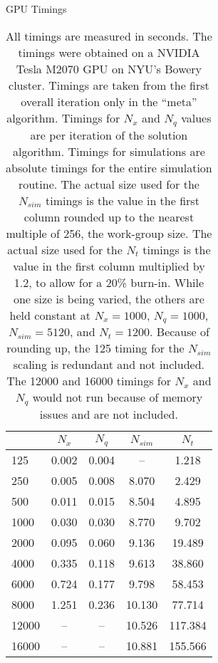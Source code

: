 \documentclass[a4paper,12pt]{article}
\numberwithin{equation}{section}
\theoremstyle{definition}
\begin{document}
\begin{table}[ht]
  \centering
  \caption{GPU Timings}
  \label{tab:timings}
  \begin{tabular}{l c c c c}
    \toprule
    & $N_x$ & $N_q$ & $N_{sim}$ & $N_t$ \\
    \midrule
    125 & 0.002 & 0.004 &  -- & 1.218 \\
    250 & 0.005 & 0.008 & 8.070 & 2.429 \\
    500 & 0.011 & 0.015 & 8.504 & 4.895 \\
    1000 & 0.030 & 0.030 & 8.770 & 9.702 \\
    2000 & 0.095 & 0.060 & 9.136 & 19.489 \\
    4000 & 0.335 & 0.118 & 9.613 & 38.860 \\
    6000 & 0.724 & 0.177 & 9.798 & 58.453 \\
    8000 & 1.251 & 0.236 & 10.130 & 77.714 \\
    12000 &  -- &  -- & 10.526 & 117.384 \\
    16000 &  -- &  -- & 10.881 & 155.566 \\
    \bottomrule
  \end{tabular}
  \caption*{\footnotesize All timings are measured in seconds. The timings were obtained on a NVIDIA Tesla M2070 GPU on NYU's Bowery cluster. Timings are taken from the first overall iteration only in the ``meta'' algorithm. Timings for $N_x$ and $N_q$ values are per iteration of the solution algorithm. Timings for simulations are absolute timings for the entire simulation routine. The actual size used for the $N_{sim}$ timings is the value in the first column rounded up to the nearest multiple of 256, the work-group size. The actual size used for the $N_t$ timings is the value in the first column multiplied by 1.2, to allow for a 20\% burn-in. While one size is being varied, the others are held constant at $N_x = 1000$, $N_q = 1000$, $N_{sim} = 5120$, and $N_t = 1200$. Because of rounding up, the 125 timing for the $N_{sim}$ scaling is redundant and not included. The 12000 and 16000 timings for $N_x$ and $N_q$ would not run because of memory issues and are not included.}
\end{table}
\end{document}
